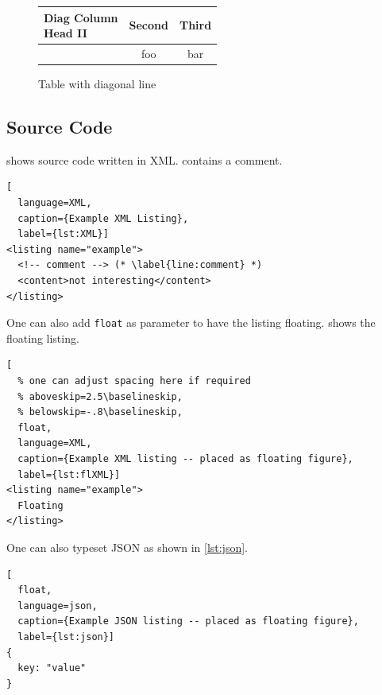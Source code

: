 \begin{ltgexample}
\begin{figure}
  \caption{Table with diagonal line}
  \label{tab:diag}
  \begin{center}
    \begin{tabular}{|l|c|c|}
      \hline
      \diagbox[width=10em]{Diag \\Column Head I}{Diag Column\\Head II} & Second & Third \\
      \hline
       & foo & bar              \\
      \hline
    \end{tabular}
  \end{center}
\end{figure}
\end{ltgexample}


\subsection{Source Code}

\begin{ltgexample}
 shows source code written in XML.
 contains a comment.

\begin{lstlisting}[
  language=XML,
  caption={Example XML Listing},
  label={lst:XML}]
<listing name="example">
  <!-- comment --> (* \label{line:comment} *)
  <content>not interesting</content>
</listing>
\end{lstlisting}
\end{ltgexample}

One can also add \verb+float+ as parameter to have the listing floating.
 shows the floating listing.

\begin{ltgexample}
\begin{lstlisting}[
  % one can adjust spacing here if required
  % aboveskip=2.5\baselineskip,
  % belowskip=-.8\baselineskip,
  float,
  language=XML,
  caption={Example XML listing -- placed as floating figure},
  label={lst:flXML}]
<listing name="example">
  Floating
</listing>
\end{lstlisting}
\end{ltgexample}

One can also typeset JSON as shown in \cref{lst:json}.

\begin{ltgexample}
\begin{lstlisting}[
  float,
  language=json,
  caption={Example JSON listing -- placed as floating figure},
  label={lst:json}]
{
  key: "value"
}
\end{lstlisting}
\end{ltgexample}

